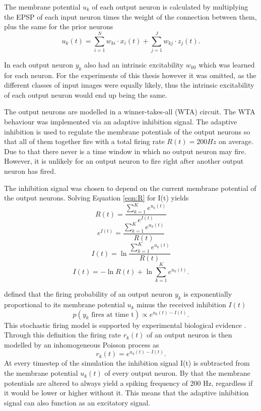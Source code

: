 The membrane potential $u_k$ of each output neuron is calculated by multiplying the EPSP of each input neuron times the weight of the connection between them, plus the same for the prior neurons
\begin{equation}
\label{eqn:uk}
u_k(t) = \sum_{i=1}^N w_{ki} \cdot x_i(t) + \sum_{j=1}^J w_{kj} \cdot z_j(t).
\end{equation}

In \citet{nessler} each output neuron $y_k$ also had an intrinsic excitability $w_{k0}$ which was learned for each neuron. For the experiments of this thesis however it was omitted, as the different classes of  input images were equally likely, thus the intrinsic excitability of each output neuron would end up being the same.

The output neurons are modelled in a winner-takes-all (WTA) circuit. The WTA behaviour was implemented via an adaptive inhibition signal. The adaptive inhibition is used to regulate
the membrane potentials of the output neurons so that all of them together fire with a total firing rate $R(t) = 200 Hz$ on average. Due to that there never is a time window in which no output neuron may fire. However, it is unlikely for an output neuron to fire right after another output neuron has fired.

The inhibition signal was chosen to depend on the current membrane potential of the output neurons. 
Solving Equation \ref{eqn:R} for I(t) yields
\begin{equation}
\label{}
R(t) = \frac{ \sum_{k=1}^K e^{u_k(t)}}{e^{I(t)}}
\end{equation}
\begin{equation}
\label{}
e^{I(t)} = \frac{\sum_{k=1}^K e^{u_k(t)}}{R(t)}
\end{equation}
\begin{equation}
\label{}
I(t) = \ln{ \frac{ \sum_{k=1}^K e^{u_k(t)}}{R(t)}}
\end{equation}
\begin{equation}
\label{eqn:I(t)}
I(t) =  - \ln{R(t)} + \ln{  \sum_{k=1}^K e^{u_k(t)}}.
\end{equation}

\citet{nessler} defined that the firing probability of an output neuron  $y_k$ is exponentially proportional to its membrane potential $u_k$ minus the received inhibition $I(t)$
\begin{equation}
\label{eqn:pVonY}
p(y_k \text{ fires at time t}) \propto e^{u_k(t) - I(t)}.
\end{equation}
This stochastic firing model is supported by experimental biological evidence \citep{woDasEHerkommt}. Through this definition the firing rate $r_k(t)$ of an output neuron is then modelled by an inhomogeneous Poisson process as
\begin{equation}
\label{eqn:rk}
r_k(t) = e^{u_k(t) - I(t)}.
\end{equation}
At every timestep of the simulation the inhibition signal I(t) is subtracted from the membrane potential $u_k(t)$ of every output neuron. By that the membrane potentials are altered to always yield a spiking frequency of 200 Hz, regardless if it would be lower or higher without it. This means that the adaptive inhibition signal can also function as an excitatory signal. 

